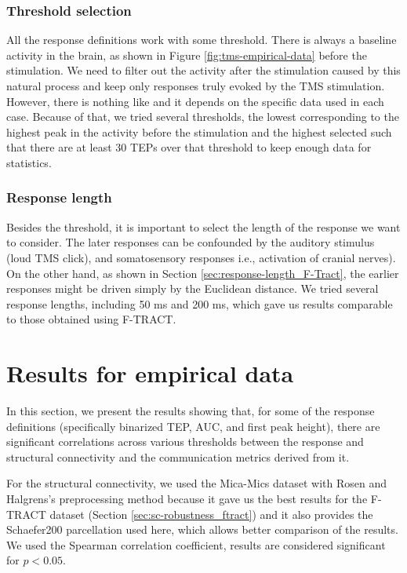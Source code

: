\subsubsection{Threshold selection}

All the response definitions work with some threshold. There is always a baseline activity in the brain, as shown in Figure \ref{fig:tms-empirical-data} before the stimulation. We need to filter out the activity after the stimulation caused by this natural process and keep only responses truly evoked by the TMS stimulation. However, there is nothing like  and it depends on the specific data used in each case. Because of that, we tried several thresholds, the lowest corresponding to the highest peak in the activity before the stimulation and the highest selected such that there are at least 30 TEPs over that threshold to keep enough data for statistics.

\subsubsection{Response length}

Besides the threshold, it is important to select the length of the response we want to consider. The later responses can be confounded by the auditory stimulus (loud TMS click), and somatosensory responses i.e., activation of cranial nerves). \cite{hernandez-pavon_tms_2023} On the other hand, as shown in Section \ref{sec:response-length_F-Tract}, the earlier responses might be driven simply by the Euclidean distance. We tried several response lengths, including 50 ms and 200 ms, which gave us results comparable to those obtained using F-TRACT.

\section{Results for empirical data}\label{sec:results_pytepfit-empirical}

In this section, we present the results showing that, for some of the response definitions (specifically binarized TEP, AUC, and first peak height), there are significant correlations across various thresholds between the response and structural connectivity and the communication metrics derived from it. 

For the structural connectivity, we used the Mica-Mics dataset with Rosen and Halgrens's preprocessing method because it gave us the best results for the F-TRACT dataset (Section \ref{sec:sc-robustness_ftract}) and it also provides the Schaefer200 parcellation used here, which allows better comparison of the results. We used the Spearman correlation coefficient, results are considered significant for $p<0.05$.

